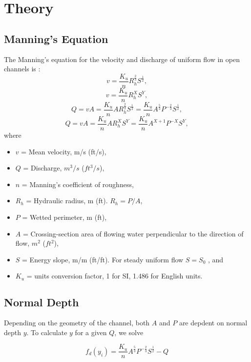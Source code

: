 \section{Theory}
\subsection{Manning's Equation}
The Manning's equation for the velocity and discharge of uniform flow in open channels is \cite{Chow1959,French1985,hds4,Munson2013}:
\begin{equation}  
v = \frac{K_u}{n}R_h^{\frac{2}{3}}S^{\frac{1}{2}},
\label{Eq:v}
\end{equation}
\begin{equation}  
v = \frac{K_u}{n}R_h^XS^Y,
\end{equation}
\begin{equation}  
Q = vA = \frac{K_u}{n}AR_h^{\frac{2}{3}}S^{\frac{1}{2}}=\frac{K_u}{n}A^{\frac{5}{3}}P^{-\frac{2}{3}}S^{\frac{1}{2}},
\label{Eq:Q}
\end{equation}
\begin{equation}  
Q = vA = \frac{K_u}{n}AR_h^XS^Y=\frac{K_u}{n}A^{X+1}P^{-X}S^{Y},
\end{equation}
where
\begin{itemize}
\item[] $v$ = Mean velocity, m/s (ft/s),
\item[] $Q$ = Discharge, $m^3/s$ ($ft^3/s$),
\item[] $n$ = Manning's coefficient of roughness,
\item[] $R_h$ = Hydraulic radius, m (ft). $R_h = P/A$,
\item [] $P$ = Wetted perimeter, m (ft),
\item [] $A$ = Crossing-section area of flowing water perpendicular to the direction of flow, $m^2$ ($ft^2$),
\item[] $S$ = Energy slope, m/m (ft/ft). For steady uniform flow $S=S_0$ , and
\item[] $K_u$ = units conversion factor, 1 for SI, 1.486 for English units.
\end{itemize}

\subsection{Normal Depth}
Depending on the geometry of the channel, both $A$ and $P$ are depdent on normal depth $y$. To calculate $y$ for a given $Q$, we solve 

\begin{equation}  
f_d(y_{i})= \frac{K_u}{n}A^{\frac{5}{3}}P^{-\frac{2}{3}}S^{\frac{1}{2}} - Q 
\end{equation}

